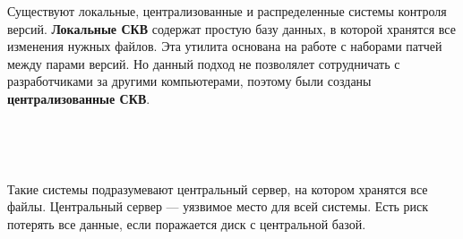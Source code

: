 \documentclass{article}
\begin{document}
Существуют локальные, централизованные и распределенные системы контроля версий.
\textbf{Локальные СКВ} содержат простую базу данных, в которой хранятся все изменения нужных файлов. Эта утилита основана на работе с наборами патчей между парами версий. Но данный подход не позволялет сотрудничать с разработчиками за другими компьютерами, поэтому были созданы \textbf{централизованные СКВ}.

~\

\begin{figure}[h]
\end{figure}

~\

Такие системы подразумевают центральный сервер, на котором хранятся все файлы. 
Центральный сервер — уязвимое место для всей системы. Есть риск потерять все данные, если поражается диск с центральной базой.

~\

\begin{figure}[h]
\end{figure}
\end{document}
